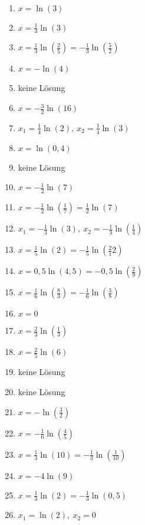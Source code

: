 \newpage
\begin{Answer}[ref=eFktGlA1]\\
	\begin{minipage}{\textwidth}
		\begin{minipage}{0.49\textwidth}
			\begin{enumerate}[label=\alph*)]
				\item \(x=\ln\left(3\right)\)
				\item \(x=\frac{1}{3}\ln\left(3\right)\)
				\item \(x=\frac{1}{3}\ln\left(\frac{2}{5}\right)=-\frac{1}{3}\ln\left(\frac{5}{2}\right)\)
				\item \(x=-\ln\left(4\right)\)
				\item keine Lösung
				\item \(x=-\frac{3}{2}\ln\left(16\right)\)
				\item \(x_1=\frac{1}{4}\ln\left(2\right),\ x_2=\frac{1}{4}\ln\left(3\right)\)
				\item \(x=\ln\left(0,4\right)\)
				\item keine Lösung
				\item \(x=-\frac{1}{2}\ln\left(7\right)\)
				\item \(x=-\frac{1}{2}\ln\left(\frac{1}{7}\right)=\frac{1}{2}\ln\left(7\right)\)
				\item \(x_1=-\frac{1}{3}\ln\left(3\right),\ x_2=-\frac{1}{3}\ln\left(\frac{1}{4}\right)\)
				\item \(x=\frac{1}{5}\ln\left(2\right)=-\frac{1}{5}\ln\left(\frac{2}{1}2\right)\)
			\end{enumerate}
		\end{minipage}
		\begin{minipage}{0.49\textwidth}
			\begin{enumerate}[label=\alph*)]
				\setcounter{enumi}{13}
				\item \(x=0,5\ln\left(4,5\right)=-0,5\ln\left(\frac{2}{9}\right)\)
				\item \(x=\frac{1}{6}\ln\left(\frac{8}{3}\right)=-\frac{1}{6}\ln\left(\frac{3}{8}\right)\)
				\item \(x=0\)
				\item \(x=\frac{2}{3}\ln\left(\frac{1}{3}\right)\)
				\item \(x=\frac{2}{5}\ln\left(6\right)\)
				\item keine Lösung
				\item keine Lösung
				\item \(x=-\ln\left(\frac{3}{2}\right)\)
				\item \(x=-\frac{1}{6}\ln\left(\frac{4}{5}\right)\)
				\item \(x=\frac{1}{3}\ln\left(10\right)=-\frac{1}{3}\ln\left(\frac{1}{10}\right)\)
				\item \(x=-4\ln\left(9\right)\)
				\item \(x=\frac{1}{3}\ln\left(2\right)=-\frac{1}{3}\ln\left(0,5\right)\)
				\item \(x_1=\ln\left(2\right),\ x_2=0\)
			\end{enumerate}
		\end{minipage}
	\end{minipage}
\end{Answer}